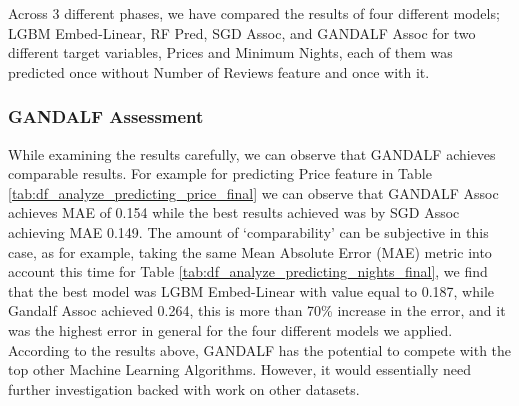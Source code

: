 \documentclass[a4paper,12pt]{article}
\begin{document}
\begin{table}[h!]
    \centering
    \caption{df-Analyze Final Results of the 3 phases Predicting Minimum Nights}
    \label{tab:df_analyze_predicting_nights_final}
\end{table}

Across 3 different phases, we have compared the results of four different models; LGBM Embed-Linear, RF Pred, SGD Assoc, and GANDALF Assoc for two different target variables, Prices and Minimum Nights, each of them was predicted once without Number of Reviews feature and once with it.

\subsubsection*{GANDALF Assessment}

While examining the results carefully, we can observe that GANDALF achieves comparable results. For example for predicting Price feature in Table \ref{tab:df_analyze_predicting_price_final} we can observe that GANDALF Assoc achieves MAE of 0.154 while the best results achieved was by SGD Assoc achieving MAE 0.149. The amount of `comparability' can be subjective in this case, as for example, taking the same Mean Absolute Error (MAE) metric into account this time for Table \ref{tab:df_analyze_predicting_nights_final}, we find that the best model was LGBM Embed-Linear with value equal to 0.187, while Gandalf Assoc achieved 0.264, this is more than 70\% increase in the error, and it was the highest error in general for the four different models we applied. According to the results above, GANDALF has the potential to compete with the top other Machine Learning Algorithms. However, it would essentially need further investigation backed with work on other datasets.
\end{document}

